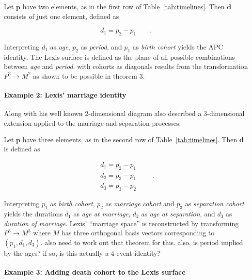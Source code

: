 \documentclass[12pt,oneside,a4paper]{article} %
\theoremstyle{definition}
\newcommand\vt[1]{\textcolor{rd}{#1}}
\begin{document}
Let $\textbf{p}$ have two elements, as in the first row of
Table~\ref{tab:timelines}. Then $\textbf{d}$ consists of just one element, defined as

\begin{equation}
d_1 = p_2 - p_1   \quad\quad.
\end{equation}

Interpreting $d_1$ as \textit{age}, $p_2$ as \textit{period}, and $p_1$ as
\textit{birth cohort} yields the APC identity. The Lexis surface is defined as the plane of
all possible combinations between \textit{age} and \textit{period}.
\vt{with cohorts as diagonals results from the transformation $P^2 \rightarrow
M^2$ as shown to be possible in theorem 3.}


\paragraph{Example 2: Lexis' marriage identity}

Along with his well known 2-dimensional diagram \citet{lexis1875einleitung} also
described a 3-dimensional extension applied to the marriage and
separation processes.

Let $\textbf{p}$ have three elements, as in the second row of
Table~\ref{tab:timelines}. Then $\textbf{d}$ is defined as

\begin{equation}
\label{eq:p3}
\begin{matrix}
d_1 = p_2 - p_1\\
d_2 = p_3 - p_1\\
d_3 = p_3 - p_2
\end{matrix} \quad\quad.
\end{equation}

Interpreting $p_1$ as \textit{birth cohort}, $p_2$ as \textit{marriage cohort} and $p_3$ as
 \textit{separation cohort} yields the durations $d_1$ as \textit{age at
 marriage}, $d_2$ as \textit{age at separation}, and $d_3$ as \textit{duration
 of marriage}. Lexis' ``marriage space'' is reconstructed by transforming $P^3
 \rightarrow M^3$ where $M$ has three orthogonal basis vectors corresponding to
 $(p_1, d_1, d_3)$. \vt{also need to work out that theorem for this.} \vt{also,
 is period implied by the ages? if so, is this actually a 4-event identity?}

\paragraph{Example 3: Adding death cohort to the Lexis surface}
\end{document}
